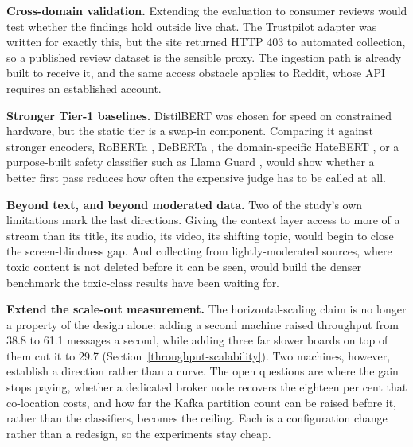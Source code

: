 \textbf{Cross-domain validation.} Extending the evaluation to consumer reviews would test whether the findings hold outside live chat. The Trustpilot adapter was written for exactly this, but the site returned HTTP 403 to automated collection, so a published review dataset is the sensible proxy. The ingestion path is already built to receive it, and the same access obstacle applies to Reddit, whose API requires an established account.

\textbf{Stronger Tier-1 baselines.} DistilBERT was chosen for speed on constrained hardware, but the static tier is a swap-in component. Comparing it against stronger encoders, RoBERTa \citep{roberta2019}, DeBERTa \citep{deberta2021}, the domain-specific HateBERT \citep{hatebert2021}, or a purpose-built safety classifier such as Llama Guard \citep{llamaguard2023}, would show whether a better first pass reduces how often the expensive judge has to be called at all.

\textbf{Beyond text, and beyond moderated data.} Two of the study's own limitations mark the last directions. Giving the context layer access to more of a stream than its title, its audio, its video, its shifting topic, would begin to close the screen-blindness gap. And collecting from lightly-moderated sources, where toxic content is not deleted before it can be seen, would build the denser benchmark the toxic-class results have been waiting for.

\textbf{Extend the scale-out measurement.} The horizontal-scaling claim is no longer a property of the design alone: adding a second machine raised throughput from 38.8 to 61.1 messages a second, while adding three far slower boards on top of them cut it to 29.7 (Section~\ref{throughput-scalability}). Two machines, however, establish a direction rather than a curve. The open questions are where the gain stops paying, whether a dedicated broker node recovers the eighteen per cent that co-location costs, and how far the Kafka partition count can be raised before it, rather than the classifiers, becomes the ceiling. Each is a configuration change rather than a redesign, so the experiments stay cheap.


